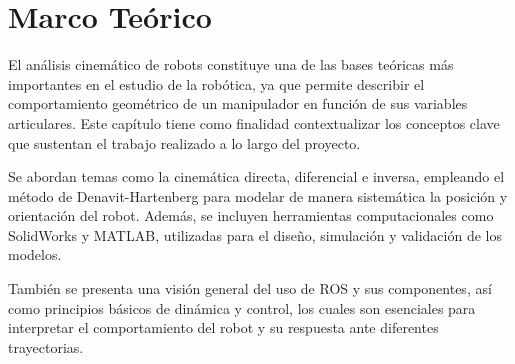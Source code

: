 \chapter{Marco Teórico} 
\label{chap:marco_teorico}

El análisis cinemático de robots constituye una de las bases teóricas más importantes en el estudio de la robótica, ya que permite describir el comportamiento geométrico de un manipulador en función de sus variables articulares. Este capítulo tiene como finalidad contextualizar los conceptos clave que sustentan el trabajo realizado a lo largo del proyecto.

Se abordan temas como la cinemática directa, diferencial e inversa, empleando el método de Denavit-Hartenberg para modelar de manera sistemática la posición y orientación del robot. Además, se incluyen herramientas computacionales como SolidWorks y MATLAB, utilizadas para el diseño, simulación y validación de los modelos.

También se presenta una visión general del uso de ROS y sus componentes, así como principios básicos de dinámica y control, los cuales son esenciales para interpretar el comportamiento del robot y su respuesta ante diferentes trayectorias.